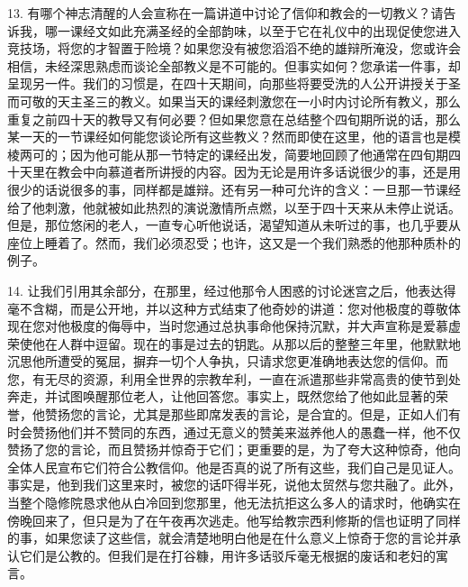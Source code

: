 13. 有哪个神志清醒的人会宣称在一篇讲道中讨论了信仰和教会的一切教义？请告诉我，哪一课经文如此充满圣经的全部韵味，以至于它在礼仪中的出现促使您进入竞技场，将您的才智置于险境？如果您没有被您滔滔不绝的雄辩所淹没，您或许会相信，未经深思熟虑而谈论全部教义是不可能的。但事实如何？您承诺一件事，却呈现另一件。我们的习惯是，在四十天期间，向那些将要受洗的人公开讲授关于圣而可敬的天主圣三的教义。如果当天的课经刺激您在一小时内讨论所有教义，那么重复之前四十天的教导又有何必要？但如果您意在总结整个四旬期所说的话，那么某一天的一节课经如何能您谈论所有这些教义？然而即使在这里，他的语言也是模棱两可的；因为他可能从那一节特定的课经出发，简要地回顾了他通常在四旬期四十天里在教会中向慕道者所讲授的内容。因为无论是用许多话说很少的事，还是用很少的话说很多的事，同样都是雄辩。还有另一种可允许的含义：一旦那一节课经给了他刺激，他就被如此热烈的演说激情所点燃，以至于四十天来从未停止说话。但是，那位悠闲的老人，一直专心听他说话，渴望知道从未听过的事，也几乎要从座位上睡着了。然而，我们必须忍受；也许，这又是一个我们熟悉的他那种质朴的例子。\par

14. 让我们引用其余部分，在那里，经过他那令人困惑的讨论迷宫之后，他表达得毫不含糊，而是公开地，并以这种方式结束了他奇妙的讲道：您对他极度的尊敬体现在您对他极度的侮辱中，当时您通过总执事命他保持沉默，并大声宣称是爱慕虚荣使他在人群中逗留。现在的事是过去的钥匙。从那以后的整整三年里，他默默地沉思他所遭受的冤屈，摒弃一切个人争执，只请求您更准确地表达您的信仰。而您，有无尽的资源，利用全世界的宗教牟利，一直在派遣那些非常高贵的使节到处奔走，并试图唤醒那位老人，让他回答您。事实上，既然您给了他如此显著的荣誉，他赞扬您的言论，尤其是那些即席发表的言论，是合宜的。但是，正如人们有时会赞扬他们并不赞同的东西，通过无意义的赞美来滋养他人的愚蠢一样，他不仅赞扬了您的言论，而且赞扬并惊奇于它们；更重要的是，为了夸大这种惊奇，他向全体人民宣布它们符合公教信仰。他是否真的说了所有这些，我们自己是见证人。事实是，他到我们这里来时，被您的话吓得半死，说他太贸然与您共融了。此外，当整个隐修院恳求他从白冷回到您那里，他无法抗拒这么多人的请求时，他确实在傍晚回来了，但只是为了在午夜再次逃走。他写给教宗西利修斯的信也证明了同样的事，如果您读了这些信，就会清楚地明白他是在什么意义上惊奇于您的言论并承认它们是公教的。但我们是在打谷糠，用许多话驳斥毫无根据的废话和老妇的寓言。\par

